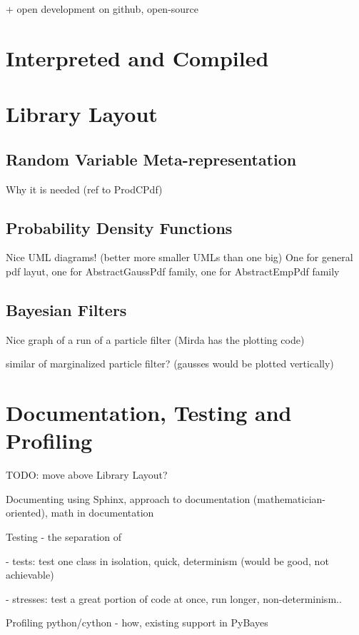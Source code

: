 \documentclass[a4paper,12pt,oneside]{report}
\begin{document}
+ open development on github, open-source

\section{Interpreted and Compiled}

\section{Library Layout}

\subsection{Random Variable Meta-representation}

Why it is needed (ref to ProdCPdf)

\subsection{Probability Density Functions}

Nice UML diagrams! (better more smaller UMLs than one big) One for general pdf layut, one for
AbstractGaussPdf family, one for AbstractEmpPdf family

\subsection{Bayesian Filters}

Nice graph of a run of a particle filter (Mirda has the plotting code)

similar of marginalized particle filter? (gausses would be plotted vertically)

\section{Documentation, Testing and Profiling}

TODO: move above Library Layout?

Documenting using Sphinx, approach to documentation (mathematician-oriented), math in documentation

Testing - the separation of

	- tests: test one class in isolation, quick, determinism (would be good, not achievable)

	- stresses: test a great portion of code at once, run longer, non-determinism..

Profiling python/cython - how, existing support in PyBayes
\end{document}
